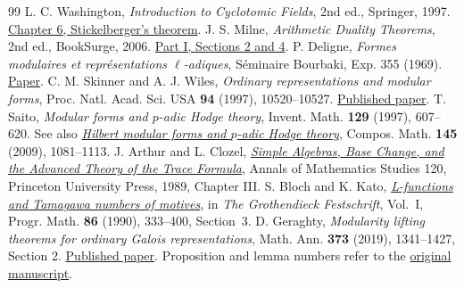 \documentclass[a4paper,11pt]{article}
\theoremstyle{definition}
\theoremstyle{remark}
\numberwithin{equation}{section}
\begin{document}
\begin{thebibliography}{99}
 L. C. Washington, \emph{Introduction to Cyclotomic Fields}, 2nd ed., Springer, 1997. \href{https://link.springer.com/book/10.1007/978-1-4612-1934-7}{Chapter 6, Stickelberger's theorem}.
 J. S. Milne, \emph{Arithmetic Duality Theorems}, 2nd ed., BookSurge, 2006. \href{https://www.jmilne.org/math/Books/ADTnot.pdf}{Part I, Sections 2 and 4}.
 P. Deligne, \emph{Formes modulaires et repr\'esentations \(\ell\)-adiques}, S\'eminaire Bourbaki, Exp. 355 (1969). \href{https://www.numdam.org/item/SB_1968-1969__11__139_0.pdf}{Paper}.
 C. M. Skinner and A. J. Wiles, \emph{Ordinary representations and modular forms}, Proc. Natl. Acad. Sci. USA \textbf{94} (1997), 10520--10527. \href{https://doi.org/10.1073/pnas.94.20.10520}{Published paper}.
 T. Saito, \emph{Modular forms and \(p\)-adic Hodge theory}, Invent. Math. \textbf{129} (1997), 607--620. See also \href{https://www.ms.u-tokyo.ac.jp/~t-saito/pp/h.pdf}{\emph{Hilbert modular forms and \(p\)-adic Hodge theory}}, Compos. Math. \textbf{145} (2009), 1081--1113.
 J. Arthur and L. Clozel, \href{https://www.claymath.org/library/cw/arthur/pdf/30.pdf}{\emph{Simple Algebras, Base Change, and the Advanced Theory of the Trace Formula}}, Annals of Mathematics Studies 120, Princeton University Press, 1989, Chapter III.
 S. Bloch and K. Kato, \href{https://virtualmath1.stanford.edu/~conrad/BSDseminar/refs/BKTamagawa.pdf}{\emph{L-functions and Tamagawa numbers of motives}}, in \emph{The Grothendieck Festschrift}, Vol.~I, Progr. Math. \textbf{86} (1990), 333--400, Section~3.
 D. Geraghty, \emph{Modularity lifting theorems for ordinary Galois representations}, Math. Ann. \textbf{373} (2019), 1341--1427, Section 2. \href{https://doi.org/10.1007/s00208-018-1742-4}{Published paper}. Proposition and lemma numbers refer to the \href{https://citeseerx.ist.psu.edu/document?doi=8faa2d675c94ae78d0ac8ebb3f9d4f69ede42d44\&repid=rep1\&type=pdf}{original manuscript}.
\end{thebibliography}\endgroup
\end{document}
